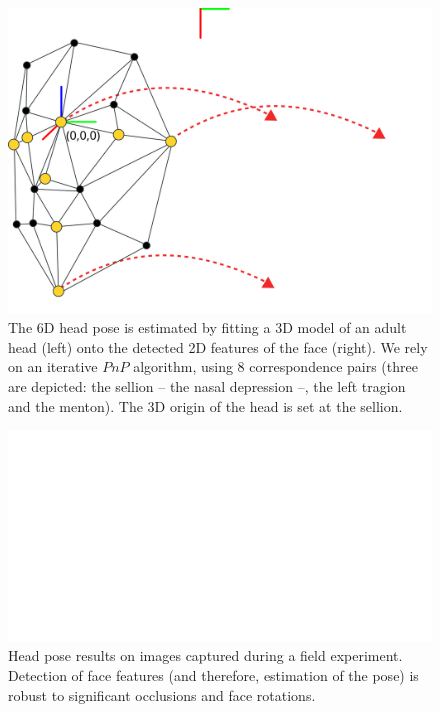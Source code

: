 \documentclass{sig-alternate}
\begin{document}
\begin{figure}[t]
    \centering
    \includegraphics[width=0.9\linewidth]{head_pose}
    \caption{The 6D head pose is estimated by fitting a 3D model of an
        adult head (left) onto the detected 2D features of the face (right). We
        rely on an iterative $PnP$ algorithm, using 8 correspondence pairs
        (three are depicted: the sellion -- the nasal depression --, the left
        tragion and the menton). The 3D origin of the head is set at the sellion.}

    \label{head_pose}
\end{figure}

\begin{figure}[t]
    \centering
    \includegraphics[width=\linewidth]{head_pose_real_world}
    \caption{Head pose results on images captured during a field experiment.
    Detection of face features (and therefore, estimation of the pose) is robust
    to significant occlusions and face rotations.}
    \label{head_pose_real_world}
\end{figure}
\end{document}
